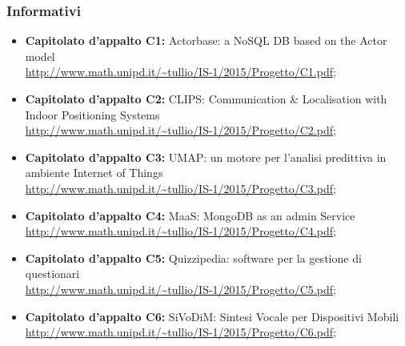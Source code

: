 \subsubsection{Informativi}
\begin{itemize}
\item \textbf{Capitolato d'appalto C1:} Actorbase: a NoSQL DB based on the Actor model
\\\url{http://www.math.unipd.it/~tullio/IS-1/2015/Progetto/C1.pdf};
\item \textbf{Capitolato d'appalto C2:} CLIPS: Communication & Localisation with Indoor Positioning Systems
\\\url{http://www.math.unipd.it/~tullio/IS-1/2015/Progetto/C2.pdf}; 
\item \textbf{Capitolato d'appalto C3:} UMAP: un motore per l'analisi predittiva in ambiente Internet of Things 
\\\url{http://www.math.unipd.it/~tullio/IS-1/2015/Progetto/C3.pdf}; 
\item \textbf{Capitolato d'appalto C4:} MaaS: MongoDB as an admin Service
\\\url{http://www.math.unipd.it/~tullio/IS-1/2015/Progetto/C4.pdf}; 
\item \textbf{Capitolato d'appalto C5:} Quizzipedia: software per la gestione di questionari
\\\url{http://www.math.unipd.it/~tullio/IS-1/2015/Progetto/C5.pdf}; 
\item \textbf{Capitolato d'appalto C6:} SiVoDiM: Sintesi Vocale per Dispositivi Mobili 
\\\url{http://www.math.unipd.it/~tullio/IS-1/2015/Progetto/C6.pdf};
\end{itemize}
